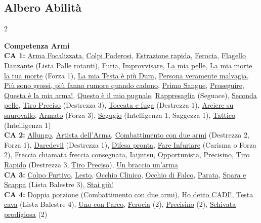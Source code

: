 \pagebreak


	\subsection{Albero Abilità}

	\newcommand{\featlink}[1]{\hyperlink{#1}{#1}}
	\newcommand{\featlinktext}[2]{\hyperlink{#1}{#2}}

	\begin{multicols}{2}
	\small

\textbf{{\large Competenza Armi}}\\

\textbf{CA 1:} \featlink{Arma Focalizzata}, \featlink{Colpi Poderosi}, \featlink{Estrazione rapida}, \featlink{Ferocia}, \featlink{Flagello Danzante} (Lista Palle rotanti), \featlink{Furia}, \featlink{Improvvisare}, \featlink{La mia pelle}, \featlink{La mia morte la tua morte} (Forza 1), \featlink{La mia Testa è più Dura}, \featlink{Persona veramente malvagia}, \featlinktext{Più sono grossi, più fanno rumore quando cadono}{Più sono grossi, più fanno rumore quando cadono}, \featlink{Primo Sangue}, \featlink{Proseguire}, \featlink{Questa è la mia arma!}, \featlink{Questo è il mio pugnale}, \featlink{Rappresaglia} (Seguace), \featlink{Seconda pelle}, \featlink{Tiro Preciso} (Destrezza 3), \featlink{Toccata e fuga} (Destrezza 1), \featlink{Arciere su saurovallo}, \featlink{Armato} (Forza 3), \featlink{Segugio} (Intelligenza 1, Saggezza 1), \featlink{Tattico} (Intelligenza 1)\\

	\textbf{CA 2:} \featlink{Allungo}, \featlink{Artista dell'Arma}, \featlink{Combattimento con due armi} (Destrezza 2, Forza 1), \featlink{Daredevil} (Destrezza 1), \featlink{Difesa pronta}, \featlink{Fare Infuriare} (Carisma o Forza 2), \featlinktext{Freccia chiamata, freccia consegnata}{Freccia chiamata freccia consegnata}, \featlink{Iaijutsu}, \featlink{Opportunista}, \featlink{Precisino}, \featlink{Tiro Rapido} (Destrezza 3, \featlink{Tiro Preciso}), \featlinktext{Un braccio, un'arma}{Un braccio un'arma}\\

	\textbf{CA 3:} \featlink{Colpo Furtivo}, \featlink{Lesto}, \featlink{Occhio Clinico}, \featlink{Occhio di Falco}, \featlink{Parata}, \featlink{Spara e Scappa} (Lista Balestre 3), \featlink{Stai giù!}\\

	\textbf{CA 4:} \featlink{Doppia porzione} (\featlink{Combattimento con due armi}), \featlink{Ho detto CADI!}, \featlink{Testa cava} (Lista Balestre 4), \featlink{Uno con l'arco}, \featlink{Ferocia} (2), \featlink{Precisino} (2), \featlink{Schivata prodigiosa} (2)\\


\end{multicols}
